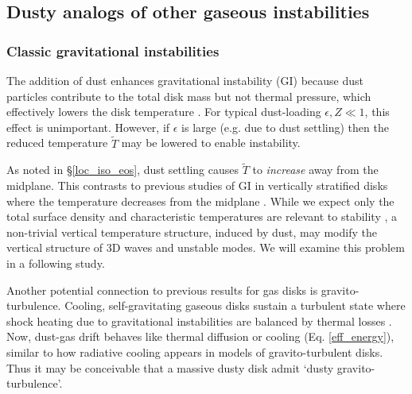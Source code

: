 \subsection{Dusty analogs of other gaseous instabilities}  


\subsubsection{Classic gravitational instabilities} %
The addition of dust enhances gravitational
instability (GI) because dust particles contribute to the
total disk mass but not thermal pressure, which effectively lowers the
disk temperature \citep[][]{thompson88,shi13}. For typical dust-loading 
$\epsilon, Z\ll1$, this effect is unimportant. However, if $\epsilon$ is
large (e.g. due to dust settling) then the reduced temperature
$\widetilde{T}$ may be lowered to enable instability.  

As noted in \S\ref{loc_iso_eos}, dust settling causes 
$\widetilde{T}$ to \emph{increase} away from the midplane. This contrasts
to previous studies of GI in vertically stratified disks
 where the temperature decreases
from the midplane \citep[e.g.][]{mamat10, kim12,lin14c}. 
While we expect only the total surface density and
characteristic temperatures are relevant to stability  
\citep{toomre64}, a non-trivial vertical temperature
structure, induced by dust, may modify the vertical structure of 3D
waves and unstable modes. We will examine this problem in a following 
study.  

Another potential connection to previous results for gas disks is  
gravito-turbulence. Cooling, self-gravitating gaseous disks 
sustain a turbulent state where shock heating due to gravitational 
instabilities are balanced by thermal losses
\citep{gammie01}. Now, dust-gas drift behaves like thermal diffusion
or cooling (Eq. \ref{eff_energy}), similar to how radiative cooling 
appears in models of gravito-turbulent disks. Thus it may be
conceivable that a massive dusty disk admit `dusty
gravito-turbulence'. 

 




